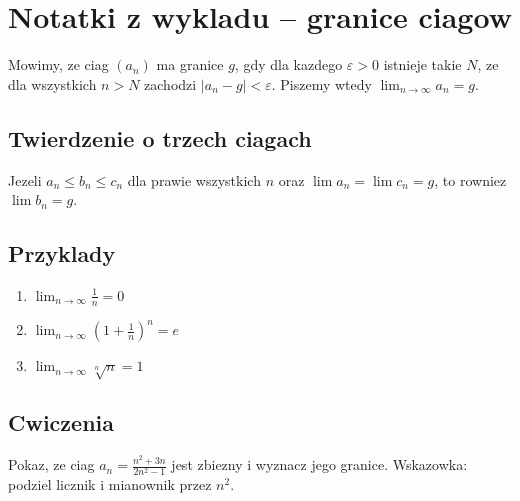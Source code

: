 \documentclass{article}
\begin{document}
\section*{Notatki z wykladu -- granice ciagow}

Mowimy, ze ciag $(a_n)$ ma granice $g$, gdy dla kazdego $\varepsilon > 0$
istnieje takie $N$, ze dla wszystkich $n > N$ zachodzi
$|a_n - g| < \varepsilon$. Piszemy wtedy $\lim_{n \to \infty} a_n = g$.

\subsection*{Twierdzenie o trzech ciagach}

Jezeli $a_n \leq b_n \leq c_n$ dla prawie wszystkich $n$ oraz
$\lim a_n = \lim c_n = g$, to rowniez $\lim b_n = g$.

\subsection*{Przyklady}

\begin{enumerate}
  \item $\lim_{n \to \infty} \frac{1}{n} = 0$
  \item $\lim_{n \to \infty} \left(1 + \frac{1}{n}\right)^n = e$
  \item $\lim_{n \to \infty} \sqrt[n]{n} = 1$
\end{enumerate}

\subsection*{Cwiczenia}

Pokaz, ze ciag $a_n = \frac{n^2 + 3n}{2n^2 - 1}$ jest zbiezny i wyznacz
jego granice. Wskazowka: podziel licznik i mianownik przez $n^2$.
\end{document}
